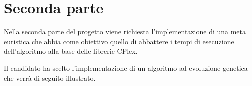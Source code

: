 %
%
\chapter{Seconda parte}
\label{pt2}
Nella seconda parte del progetto viene richiesta l'implementazione di una meta euristica che abbia come obiettivo quello di abbattere i tempi di esecuzione dell'algoritmo alla base delle librerie CPlex.

Il candidato ha scelto l'implementazione di un algoritmo ad evoluzione genetica che verrà di seguito illustrato.





